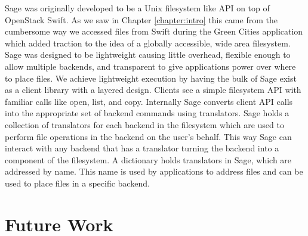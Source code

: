\label{chapter:conc}


Sage was originally developed to be a Unix filesystem like API on top of
OpenStack Swift. As we saw in Chapter \ref{chapter:intro} this came from the
cumbersome way we accessed files from Swift during the Green Cities
application which added traction to the idea of a globally accessible, wide
area filesystem. Sage was designed to be lightweight causing little overhead,
flexible enough to allow multiple backends, and transparent to give
applications power over where to place files. We achieve lightweight execution
by having the bulk of Sage exist as a client library with a layered design.
Clients see a simple filesystem API with familiar calls like open, list, and
copy. Internally Sage converts client API calls into the appropriate set of
backend commands using translators. Sage holds a collection of translators for
each backend in the filesystem which are used to perform file operations in
the backend on the user's behalf. This way Sage can interact with any backend
that has a translator turning the backend into a component of the filesystem.
A dictionary holds translators in Sage, which are addressed by name. This name
is used by applications to address files and can be used to place files in a
specific backend.





\section{Future Work}

